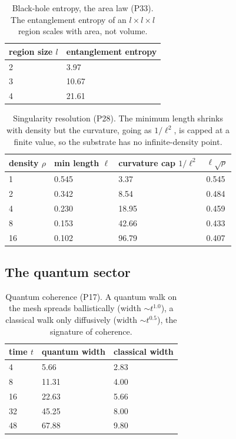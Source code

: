 \begin{table}[H]
\centering
\small
\begin{tabular}{ll}
\toprule
\multicolumn{1}{c}{region size $l$} & \multicolumn{1}{c}{entanglement entropy} \\
\midrule
2 & 3.97 \\
3 & 10.67 \\
4 & 21.61 \\
\bottomrule
\end{tabular}
\caption{Black-hole entropy, the area law (P33). The entanglement entropy of an $l \times l \times l$ region scales with area, not volume.}
\end{table}

\begin{table}[H]
\centering
\small
\begin{tabular}{llll}
\toprule
\multicolumn{1}{c}{density $\rho$} & \multicolumn{1}{c}{min length $\ell$} & \multicolumn{1}{c}{curvature cap $1/\ell^2$} & \multicolumn{1}{c}{$\ell\sqrt{\rho}$} \\
\midrule
1 & 0.545 & 3.37 & 0.545 \\
2 & 0.342 & 8.54 & 0.484 \\
4 & 0.230 & 18.95 & 0.459 \\
8 & 0.153 & 42.66 & 0.433 \\
16 & 0.102 & 96.79 & 0.407 \\
\bottomrule
\end{tabular}
\caption{Singularity resolution (P28). The minimum length shrinks with density but the curvature, going as $1/\ell^2$, is capped at a finite value, so the substrate has no infinite-density point.}
\end{table}

\subsection{The quantum sector}

\begin{table}[H]
\centering
\small
\begin{tabular}{lll}
\toprule
\multicolumn{1}{c}{time $t$} & \multicolumn{1}{c}{quantum width} & \multicolumn{1}{c}{classical width} \\
\midrule
4 & 5.66 & 2.83 \\
8 & 11.31 & 4.00 \\
16 & 22.63 & 5.66 \\
32 & 45.25 & 8.00 \\
48 & 67.88 & 9.80 \\
\bottomrule
\end{tabular}
\caption{Quantum coherence (P17). A quantum walk on the mesh spreads ballistically (width $\sim t^{1.0}$), a classical walk only diffusively (width $\sim t^{0.5}$), the signature of coherence.}
\end{table}

